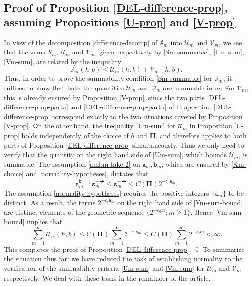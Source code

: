 \documentclass[12pt, twoside]{article}
\theoremstyle{definition}
\numberwithin{equation}{section}
\begin{document}
\subsection{Proof of Proposition \ref{DEL-difference-prop}, assuming Propositions \ref{U-prop} and \ref{V-prop}} 
In view of the decomposition \eqref{difference-decomp} of $\mathscr{S}_m$ into $\mathscr{U}_m$ and $\mathscr{V}_m$, we see that the sums $\mathcal S_m$, $\mathcal U_m$ and $\mathcal V_m$, given respectively by \eqref{Sm-summable}, \eqref{Um-sum}, \eqref{Vm-sum}, are related by the inequality 
\[ \mathcal S_m(h, b) \leq \mathcal U_m(h, b) + \mathcal V_m(h, b).  \] Thus, in order to prove the summability condition \eqref{Sm-summable} for $\mathcal S_m$,  it suffices to show that both the quantities $\mathcal U_m$ and $\mathcal V_m$ are summable in $m$. For $\mathcal V_m$, this is already ensured by Proposition \ref{V-prop}, since the two parts \eqref{DEL-difference-prop-parta} and \eqref{DEL-difference-prop-partb} of Proposition \ref{DEL-difference-prop} correspond exactly to the two situations covered by Proposition \ref{V-prop}.  On the other hand, the inequality \eqref{Um-sum} for $\mathcal U_m$ in Proposition \ref{U-prop} holds independently of the choice of $b$ and $\pmb{\Pi}$, and therefore applies to both parts of Proposition \ref{DEL-difference-prop} simultaneously.    
Thus we only need to verify that the quantity on the right hand side of \eqref{Um-sum}, which bounds $\mathcal{U}_m$, is summable. The assumption \eqref{ambm-take-2} on $\mathtt a_m, \mathtt b_m$, which are ensured by \eqref{Km-choice} and \eqref{normality-hypotheses}, dictates that 
\begin{equation} {\mathtt s_{m-1}^{\mathtt b_{m-1}}}{\mathtt s_m^{-\frac{\mathtt a_m}{2}}} \leq  \mathtt s_m^{-\frac{\mathtt a_m}{6}} \leq C(\pmb{\Pi}) 2^{-c_0 \mathtt a_m}. \label{Vm-sum-bound} \end{equation} 
The assumption \eqref{normality-hypotheses} requires the positive integers $\{\mathtt a_m\}$ to be distinct. As a result, the terms $2^{-c_0 \mathtt a_m}$ on the right hand side of \eqref{Vm-sum-bound} are distinct elements of the geometric sequence $\{2^{-c_0m} : m \geq 1\}$. Hence \eqref{Vm-sum-bound} implies that 
\begin{equation}  \label{V-prop-est}
\sum_{m=1}^{\infty} \mathcal{U}_m(h, b) \leq C(\pmb{\Pi}) \sum_{m=1}^{\infty} 2^{-c_0 \mathtt a_m} \leq C(\pmb{\Pi}) \sum_{m=1}^{\infty} 2^{-c_0 m} <  \infty. 
\end{equation}  
This completes the proof of Proposition \ref{DEL-difference-prop}. 
\qed
\vskip0.1in
\noindent To summarize the situation thus far: we have reduced the task of establishing normality to the verification of the summability criteria \eqref{Um-sum} and \eqref{Vm-sum} for $\mathcal U_m$ and $\mathcal V_m$ respectively. We deal with these tasks in the remainder of the article.   
\end{document}

